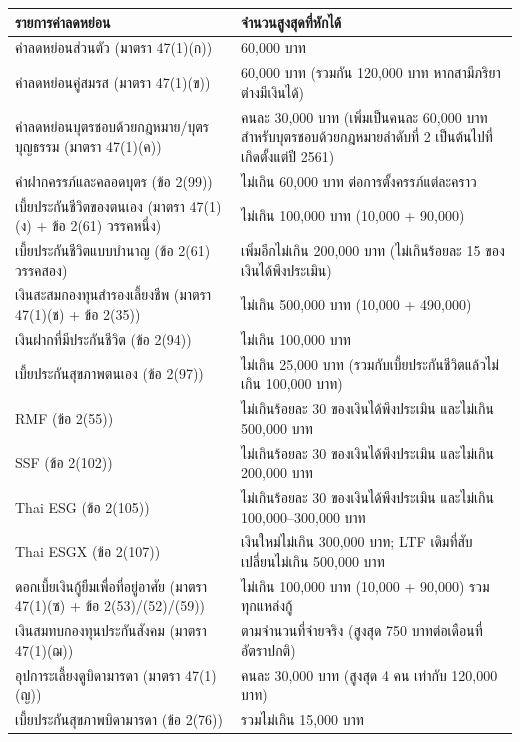 \documentclass[12pt,a4paper]{article}
\begin{document}
\begin{longtable}{|p{6.5cm}|p{8cm}|}
\hline
\textbf{รายการค่าลดหย่อน} & \textbf{จำนวนสูงสุดที่หักได้} \\
\hline
\endhead
ค่าลดหย่อนส่วนตัว (มาตรา 47(1)(ก)) & 60,000 บาท \\
\hline
ค่าลดหย่อนคู่สมรส (มาตรา 47(1)(ข)) & 60,000 บาท (รวมกัน 120,000 บาท หากสามีภริยาต่างมีเงินได้) \\
\hline
ค่าลดหย่อนบุตรชอบด้วยกฎหมาย/บุตรบุญธรรม (มาตรา 47(1)(ค)) & คนละ 30,000 บาท (เพิ่มเป็นคนละ 60,000 บาท สำหรับบุตรชอบด้วยกฎหมายลำดับที่ 2 เป็นต้นไปที่เกิดตั้งแต่ปี 2561) \\
\hline
ค่าฝากครรภ์และคลอดบุตร (ข้อ 2(99)) & ไม่เกิน 60,000 บาท ต่อการตั้งครรภ์แต่ละคราว \\
\hline
เบี้ยประกันชีวิตของตนเอง (มาตรา 47(1)(ง) + ข้อ 2(61) วรรคหนึ่ง) & ไม่เกิน 100,000 บาท (10,000 + 90,000) \\
\hline
เบี้ยประกันชีวิตแบบบำนาญ (ข้อ 2(61) วรรคสอง) & เพิ่มอีกไม่เกิน 200,000 บาท (ไม่เกินร้อยละ 15 ของเงินได้พึงประเมิน) \\
\hline
เงินสะสมกองทุนสำรองเลี้ยงชีพ (มาตรา 47(1)(ช) + ข้อ 2(35)) & ไม่เกิน 500,000 บาท (10,000 + 490,000) \\
\hline
เงินฝากที่มีประกันชีวิต (ข้อ 2(94)) & ไม่เกิน 100,000 บาท \\
\hline
เบี้ยประกันสุขภาพตนเอง (ข้อ 2(97)) & ไม่เกิน 25,000 บาท (รวมกับเบี้ยประกันชีวิตแล้วไม่เกิน 100,000 บาท) \\
\hline
RMF (ข้อ 2(55)) & ไม่เกินร้อยละ 30 ของเงินได้พึงประเมิน และไม่เกิน 500,000 บาท \\
\hline
SSF (ข้อ 2(102)) & ไม่เกินร้อยละ 30 ของเงินได้พึงประเมิน และไม่เกิน 200,000 บาท \\
\hline
Thai ESG (ข้อ 2(105)) & ไม่เกินร้อยละ 30 ของเงินได้พึงประเมิน และไม่เกิน 100,000--300,000 บาท \\
\hline
Thai ESGX (ข้อ 2(107)) & เงินใหม่ไม่เกิน 300,000 บาท; LTF เดิมที่สับเปลี่ยนไม่เกิน 500,000 บาท \\
\hline
ดอกเบี้ยเงินกู้ยืมเพื่อที่อยู่อาศัย (มาตรา 47(1)(ซ) + ข้อ 2(53)/(52)/(59)) & ไม่เกิน 100,000 บาท (10,000 + 90,000) รวมทุกแหล่งกู้ \\
\hline
เงินสมทบกองทุนประกันสังคม (มาตรา 47(1)(ฌ)) & ตามจำนวนที่จ่ายจริง (สูงสุด 750 บาทต่อเดือนที่อัตราปกติ) \\
\hline
อุปการะเลี้ยงดูบิดามารดา (มาตรา 47(1)(ญ)) & คนละ 30,000 บาท (สูงสุด 4 คน เท่ากับ 120,000 บาท) \\
\hline
เบี้ยประกันสุขภาพบิดามารดา (ข้อ 2(76)) & รวมไม่เกิน 15,000 บาท \\

\end{longtable}
\end{document}
